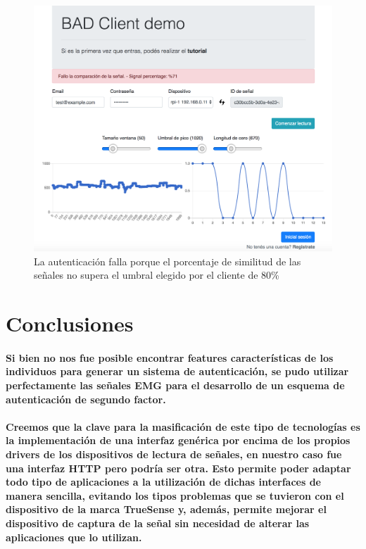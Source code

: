 \documentclass{article}
\begin{document}
\begin{figure}[ht]
    \centering
    \includegraphics[width=\textwidth]{error_1_res.png}%
    \caption{La autenticación falla porque el porcentaje de similitud de las señales no supera el umbral elegido por el cliente de 80\%}
    \label{fig:error-1}
\end{figure}

\section{Conclusiones}
\paragraph{
Si bien no nos fue posible encontrar features características de los individuos para generar un sistema de autenticación, se pudo utilizar perfectamente las señales EMG para el desarrollo de un esquema de autenticación de segundo factor.
}
\paragraph{
Creemos que la clave para la masificación de este tipo de tecnologías es la implementación de una interfaz genérica por encima de los propios drivers de los dispositivos de lectura de señales, en nuestro caso fue una interfaz HTTP pero podría ser otra. Esto permite poder adaptar todo tipo de aplicaciones a la utilización de dichas interfaces de manera sencilla, evitando los tipos problemas que se tuvieron con el dispositivo de la marca TrueSense y, además, permite mejorar el dispositivo de captura de la señal sin necesidad de alterar las aplicaciones que lo utilizan.
}
\end{document}
